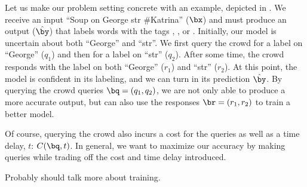 Let us make our problem setting concrete with an example, depicted in .
We receive an input ``Soup on George str \#Katrina'' ($\bx$) and must produce an output ($\byt$) that labels words with the tags \scper{}, \scloc{}, \scres{} or \scnone{}.
Initially, our model is uncertain about both ``George'' and ``str''.
We first query the crowd for a label on ``George'' ($q_1$) and then for a label on ``str'' ($q_2$). 
After some time, the crowd responds with the label \scloc{} on both ``George'' ($r_1$) and ``str'' ($r_2$).
At this point, the model is confident in its labeling, and we can turn in its prediction $\byt$.
By querying the crowd queries $\bq = (q_1, q_2)$, we are not only able to produce a more accurate output, but can also use the responses $\br = (r_1, r_2)$ to train a better model.

Of course, querying the crowd also incurs a cost for the queries as well as a time delay, $t$: $C(\bq, t)$.
In general, we want to maximize our accuracy by making queries while trading off the cost and time delay introduced.


\ac{Probably should talk more about training.}

%
%
%
